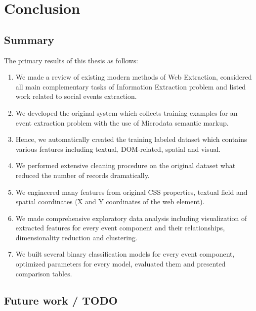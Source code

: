 \chapter{Conclusion}
\label{chap:conclusion}

\section{Summary}

The primary results of this thesis as follows: 
\begin{enumerate}
    \item We made a review of existing modern methods of Web Extraction, considered all main complementary tasks of Information Extraction problem and listed work related to social events extraction.   
    \item We developed the original system which collects training examples for an event extraction problem with the use of Microdata semantic markup.
    \item Hence, we automatically created the training labeled dataset which contains various features including textual, DOM-related, spatial and visual.
    \item We performed extensive cleaning procedure on the original dataset what reduced the number of records dramatically.
    \item We engineered many features from original CSS properties, textual field and spatial coordinates  (X and Y coordinates of the web element). 
    \item We made comprehensive exploratory data analysis including visualization of extracted features for every event component and their relationships, dimensionality reduction and clustering.
    \item We built several binary classification models for every event component, optimized parameters for every model, evaluated them and presented comparison tables. 
\end{enumerate}


\section{Future work  / TODO}